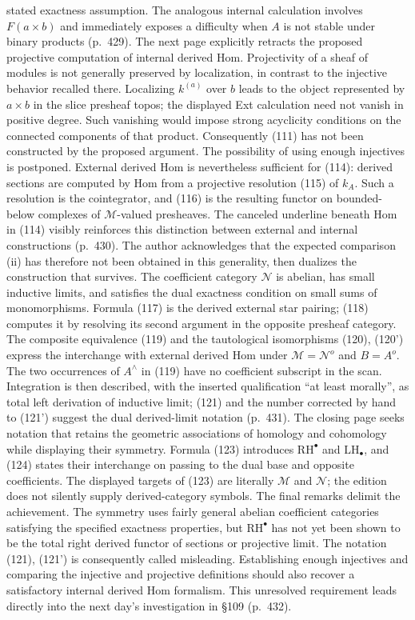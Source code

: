 stated exactness assumption. The analogous internal calculation involves $F(a\times b)$ and immediately exposes a difficulty when $A$ is not stable under binary products (p.\ 429). The next page explicitly retracts the proposed projective computation of internal derived Hom. Projectivity of a sheaf of modules is not generally preserved by localization, in contrast to the injective behavior recalled there. Localizing $k^{(a)}$ over $b$ leads to the object represented by $a\times b$ in the slice presheaf topos; the displayed Ext calculation need not vanish in positive degree. Such vanishing would impose strong acyclicity conditions on the connected components of that product. Consequently (111) has not been constructed by the proposed argument. The possibility of using enough injectives is postponed. External derived Hom is nevertheless sufficient for (114): derived sections are computed by Hom from a projective resolution (115) of $k_A$. Such a resolution is the cointegrator, and (116) is the resulting functor on bounded-below complexes of $\mathcal M$-valued presheaves. The canceled underline beneath Hom in (114) visibly reinforces this distinction between external and internal constructions (p.\ 430). The author acknowledges that the expected comparison (ii) has therefore not been obtained in this generality, then dualizes the construction that survives. The coefficient category $\mathcal N$ is abelian, has small inductive limits, and satisfies the dual exactness condition on small sums of monomorphisms. Formula (117) is the derived external star pairing; (118) computes it by resolving its second argument in the opposite presheaf category. The composite equivalence (119) and the tautological isomorphisms (120), (120') express the interchange with external derived Hom under $\mathcal M=\mathcal N^o$ and $B=A^o$. The two occurrences of $A^\wedge$ in (119) have no coefficient subscript in the scan. Integration is then described, with the inserted qualification ``at least morally'', as total left derivation of inductive limit; (121) and the number corrected by hand to (121') suggest the dual derived-limit notation (p.\ 431). The closing page seeks notation that retains the geometric associations of homology and cohomology while displaying their symmetry. Formula (123) introduces $\mathrm{RH}^{\bullet}$ and $\mathrm{LH}_{\bullet}$, and (124) states their interchange on passing to the dual base and opposite coefficients. The displayed targets of (123) are literally $\mathcal M$ and $\mathcal N$; the edition does not silently supply derived-category symbols. The final remarks delimit the achievement. The symmetry uses fairly general abelian coefficient categories satisfying the specified exactness properties, but $\mathrm{RH}^{\bullet}$ has not yet been shown to be the total right derived functor of sections or projective limit. The notation (121), (121') is consequently called misleading. Establishing enough injectives and comparing the injective and projective definitions should also recover a satisfactory internal derived Hom formalism. This unresolved requirement leads directly into the next day's investigation in \S109 (p.\ 432).

